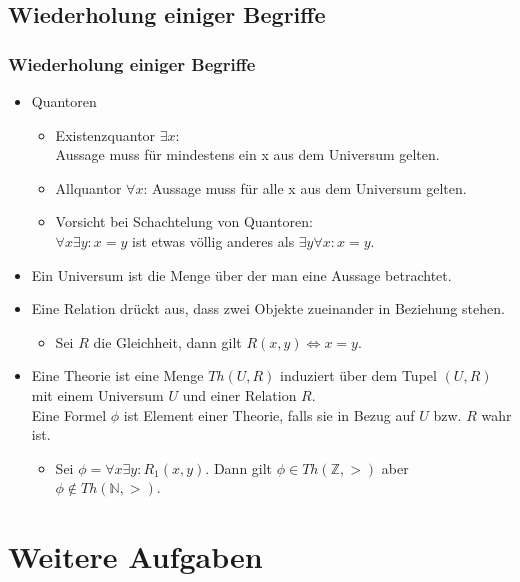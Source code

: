\subsection{Wiederholung einiger Begriffe}
\begin{frame}
	\frametitle{Wiederholung einiger Begriffe}
	\begin{itemize}
		\item Quantoren
		\begin{itemize}
			\item Existenzquantor $\exists x$: \\ Aussage muss für mindestens ein x aus dem Universum gelten.
			\item Allquantor $\forall x$: Aussage muss für alle x aus dem Universum gelten.
			\item Vorsicht bei Schachtelung von Quantoren: \\ $\forall x \exists y: x = y$ ist etwas völlig anderes als $\exists y \forall x: x = y$.
		\end{itemize}
		\item Ein Universum ist die Menge über der man eine Aussage betrachtet.
		\item Eine Relation drückt aus, dass zwei Objekte zueinander in Beziehung stehen.
		\begin{itemize}
			\item Sei $R$ die Gleichheit, dann gilt $R(x, y) \Leftrightarrow x = y$.
		\end{itemize}
		\item Eine Theorie ist eine Menge $Th(U, R)$ induziert über dem Tupel $(U, R)$ mit einem Universum $U$ und einer Relation $R$. \\ 
		Eine Formel $\phi$ ist Element einer Theorie, falls sie in Bezug auf $U$ bzw. $R$ wahr ist.
		\begin{itemize}
			\item Sei $\phi = \forall x \exists y: R_1(x,y)$. Dann gilt $\phi \in Th(\mathbb{Z}, >)$ aber $\phi \notin Th(\mathbb{N}, >)$.
		\end{itemize}
	\end{itemize}
\end{frame}

\section{Weitere Aufgaben}
